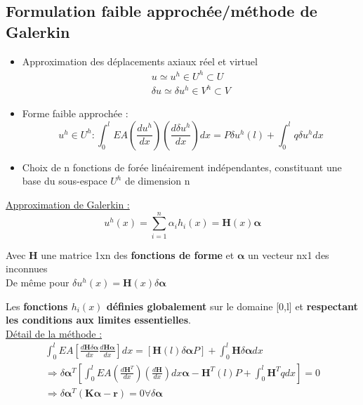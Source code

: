 \documentclass[../main.tex]{subfiles}
\begin{document}
\subsection{Formulation faible approchée/méthode de Galerkin}
\begin{itemize}
    \item Approximation des déplacements axiaux réel et virtuel \begin{equation}
        \begin{split}
            u \simeq u^h \in U^h \subset U\\
            \delta u \simeq \delta u^h \in V^h \subset V
        \end{split}
    \end{equation}
    \item Forme faible approchée : \begin{equation}
        u^h \in U^h : \int_0^l EA (\frac{du^h}{dx})(\frac{d\delta u^h}{dx})dx = P \delta u^h(l) + \int_0^l q \delta u^h dx
    \end{equation}
    \item Choix de n fonctions de forée linéairement indépendantes, constituant une base du sous-espace $U^h$ de dimension n\\
\end{itemize}

\quad \underline{Approximation de Galerkin :}\\
\begin{equation}
    u^h(x) = \sum_{i=1}^n \alpha_i h_i(x) = \mathbf{H}(x) \mathbf{\alpha}
\end{equation}

Avec $\mathbf{H}$ une matrice 1xn des \textbf{fonctions de forme} et $\mathbf{\alpha}$ un vecteur nx1 des inconnues\\

De même pour $\delta u^h(x) = \mathbf{H}(x) \delta \mathbf{\alpha}$

Les \textbf{fonctions $h_i(x)$ définies globalement} sur le domaine [0,l] et \textbf{respectant les conditions aux limites essentielles}.\\

\quad \underline{Détail de la méthode :}\\
\begin{equation}
    \begin{split}
        \int_0^l EA [\frac{d \mathbf{H}\delta \mathbf{\alpha}}{dx} \frac{d \mathbf{H} \mathbf{\alpha}}{dx}]dx = [\mathbf{H}(l) \delta \mathbf{\alpha} P] + \int_0^l \mathbf{H} \delta \mathbf{\alpha}dx\\
        \Rightarrow \delta \mathbf{\alpha}^T [\int_0^l EA (\frac{d \mathbf{H}^T}{dx})(\frac{d \mathbf{H}}{dx})dx \mathbf{\alpha}- \mathbf{H}^T(l)P + \int_0^l \mathbf{H}^Tqdx] = 0\\
        \Rightarrow \delta \mathbf{\alpha}^T (\mathbf{K} \mathbf{\alpha}-\mathbf{r})=0 \forall \delta \mathbf{\alpha}
    \end{split}
\end{equation}
\end{document}
